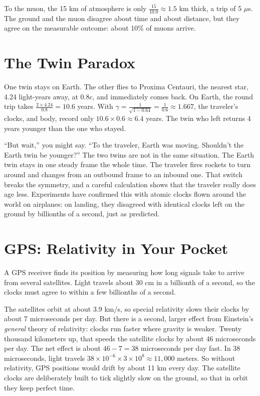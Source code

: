 To the muon, the 15 km of atmosphere is only $\frac{15}{10.0} \approx 1.5$ km thick, a trip of
5 $\mu$s. The ground and the muon disagree about time and about distance, but they agree on the
measurable outcome: about 10\% of muons arrive.

\section{The Twin Paradox}
One twin stays on Earth. The other flies to Proxima Centauri, the nearest star, 4.24 light-years
away, at $0.8c$, and immediately comes back. On Earth, the round trip takes
$\frac{2 \times 4.24}{0.8} = 10.6$ years. With $\gamma = \frac{1}{\sqrt{1 - 0.64}} = \frac{1}{0.6} \approx 1.667$,
the traveler's clocks, and body, record only $10.6 \times 0.6 \approx 6.4$ years. The twin who left
returns 4 years younger than the one who stayed.

``But wait,'' you might say. ``To the traveler, Earth was moving. Shouldn't the Earth twin be
younger?'' The two twins are not in the same situation. The Earth twin stays in one steady frame
the whole time. The traveler fires rockets to turn around and changes from an outbound frame to an
inbound one. That switch breaks the symmetry, and a careful calculation shows that the traveler
really does age less. Experiments have confirmed this with atomic clocks flown around the world on
airplanes: on landing, they disagreed with identical clocks left on the ground by billionths of a
second, just as predicted.

\section{GPS: Relativity in Your Pocket}
A GPS receiver finds its position by measuring how long signals take to arrive from several
satellites. Light travels about 30 cm in a billionth of a second, so the clocks must agree to within
a few billionths of a second.

The satellites orbit at about 3.9 km/s, so special relativity slows their clocks by about
7 microseconds per day. But there is a second, larger effect from Einstein's \emph{general}
theory of relativity: clocks run faster where gravity is weaker. Twenty thousand kilometers up,
that speeds the satellite clocks by about 46 microseconds per day. The net effect is about
$46 - 7 = 38$ microseconds per day fast. In 38 microseconds, light travels
$38 \times 10^{-6} \times 3 \times 10^8 \approx 11{,}000$ meters. So without relativity, GPS
positions would drift by about 11 km every day. The satellite clocks are deliberately built to tick
slightly slow on the ground, so that in orbit they keep perfect time.

